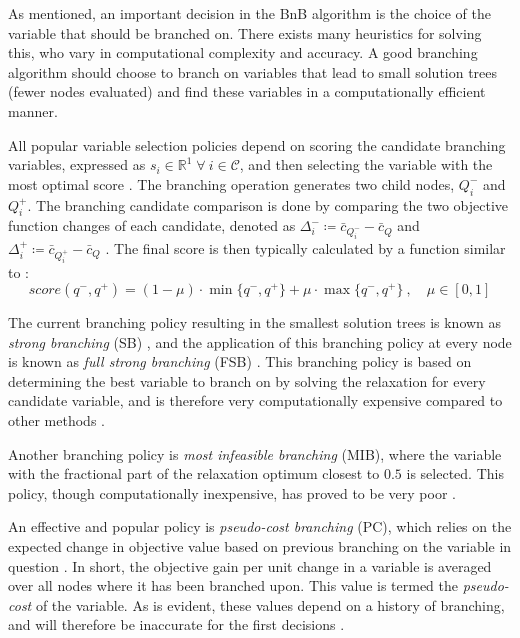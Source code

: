 As mentioned, an important decision in the \gls{BnB} algorithm is the choice of the variable that should be branched on. 
There exists many heuristics for solving this, who vary in computational complexity and accuracy. 
A good branching algorithm should choose to branch on variables that lead to small solution trees (fewer nodes evaluated) and find these variables in a computationally efficient manner. 

All popular variable selection policies depend on scoring the candidate branching variables, expressed as $s_i \in \mathbb{R}^1 \; \forall \: i \in \mathcal{C}$, and then selecting the variable with the most optimal score \cite{achterberg2004branching}. The branching operation generates two child nodes, $Q_i^-$ and $Q_i^+$. The branching candidate comparison is done by comparing the two objective function changes of each candidate, denoted as $\Delta_i^- \coloneqq \bar{c}_{Q_i^-}-\bar{c}_{Q}$ and $\Delta_i^+ \coloneqq \bar{c}_{Q_i^+}-\bar{c}_{Q}$ \cite{achterberg2004branching}. The final score is then typically calculated by a function similar to \cite{achterberg2004branching}:
\begin{equation}
    score(q^- , q^+ ) = (1 - \mu) \cdot \min \{q^- , q^+ \} + \mu \cdot \max \{q^- , q^+ \}\:,\quad \mu \in \left[0, 1\right]    
\end{equation}



The current branching policy resulting in the smallest solution trees is known as \textit{strong branching} (\gls{SB}) \cite{applegate1995finding}, and the application of this branching policy at every node is known as \textit{full strong branching} (\gls{FSB}) \cite{achterberg2004branching}. This branching policy is based on determining the best variable to branch on by solving the relaxation for every candidate variable, and is therefore very computationally expensive compared to other methods \cite{achterberg2004branching}.

Another branching policy is \textit{most infeasible branching} (\gls{MIB}), where the variable with the fractional part of the relaxation optimum closest to $0.5$ is selected. This policy, though computationally inexpensive, has proved to be very poor \cite{achterberg2004branching}. 
 
An effective and popular policy is \textit{pseudo-cost branching} (\gls{PC}), which relies on the expected change in objective value based on previous branching on the variable in question
\cite{achterberg2004branching}. In short, the objective gain per unit change in a variable is averaged over all nodes where it has been branched upon. This value is termed the \textit{pseudo-cost} of the variable. As is evident, these values depend on a history of branching, and will therefore be inaccurate for the first decisions \cite{achterberg2004branching}. 

